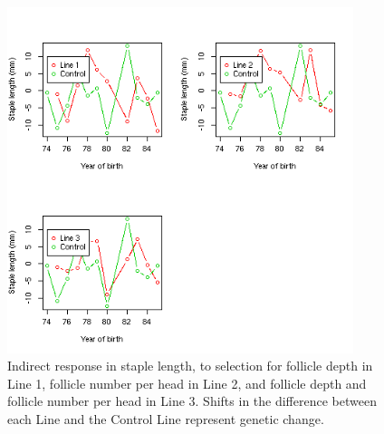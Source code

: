 %

\begin{figure}[!htp]
  \centering
   \includegraphics[width=0.9\textwidth]{dgstal.png}
  \caption{Indirect response in staple length, to selection for follicle depth in Line 1, follicle number per head in Line 2, and follicle depth and follicle number per head in Line 3. Shifts in the difference between  each Line and the  Control Line represent genetic change.}
  \label{fig:dgstal}
\end{figure}

%

